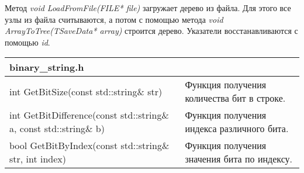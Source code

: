 Метод \textit{void LoadFromFile(FILE* file)} загружает дерево из файла. Для этого все узлы из файла считываются, а потом с помощью
метода \textit{void ArrayToTree(TSaveData* array)} строится дерево. Указатели восстанавливаются с помощью \textit{id}.

\begin{longtable}{|p{7.5cm}|p{7.5cm}|}
\hline
\rowcolor{lightgray}
\multicolumn{2}{|c|} {binary\_string.h}\\
\hline
int GetBitSize(const std::string\& str)&Функция получения количества бит в строке.\\
\hline
int GetBitDifference(const std::string\& a, const std::string\& b)&Функция получения индекса различного бита.\\
\hline
bool GetBitByIndex(const std::string\& str, int index)&Функция получения значения бита по индексу.\\
\hline
\end{longtable}

